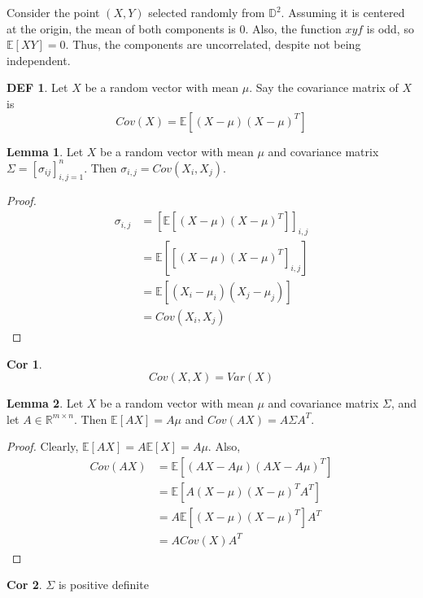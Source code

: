 \documentclass{article}
\theoremstyle{definition}\newtheorem{definition}{DEF}
\theoremstyle{lemma}\newtheorem{lemma}{Lemma}
\theoremstyle{corrolary}\newtheorem{corrolary}{Cor}
\begin{document}
\begin{example}
Consider the point $(X,Y)$ selected randomly from $\mathbb{D}^2$.
Assuming it is centered at the origin, the mean of both components is 0.
Also, the function $xyf$ is odd, so $\mathbb{E}[XY]=0$.
Thus, the components are uncorrelated, despite not being independent.
\end{example}

\begin{definition}
Let $X$ be a random vector with mean $\mu$.
Say the covariance matrix of $X$ is
\begin{equation}
Cov(X)=\mathbb{E}[(X-\mu)(X-\mu)^T]
\end{equation}
\end{definition}

\begin{lemma}
Let $X$ be a random vector with mean $\mu$ and covariance matrix $\Sigma=[\sigma_{ij}]_{i,j=1}^n$.
Then $\sigma_{i,j}=Cov(X_i, X_j)$.
\end{lemma}
\begin{proof}
\begin{align*}
\sigma_{i,j}&=\left[ \mathbb{E}[(X-\mu)(X-\mu)^T]\right]_{i,j}\\
&=\mathbb{E}\left[\left[(X-\mu)(X-\mu)^T\right]_{i,j}\right]\\
&=\mathbb{E}[(X_i -\mu_i)(X_j-\mu_j)]\\
&=Cov(X_i, X_j)
\end{align*}
\end{proof}
\begin{corrolary}
\begin{equation*}
Cov(X,X)=Var(X)
\end{equation*}
\end{corrolary}

\begin{lemma}
Let $X$ be a random vector with mean $\mu$ and covariance matrix $\Sigma$, and let $A\in \mathbb{R}^{m\times n}$.
Then $\mathbb{E}[AX]=A\mu$ and $Cov(AX)=A\Sigma A^T$.
\end{lemma}
\begin{proof}
Clearly, $\mathbb{E}[AX]=A\mathbb{E}[X]=A\mu$.
Also,
\begin{align*}
Cov(AX)&=\mathbb{E}[(AX-A\mu)(AX-A\mu)^T]\\
&=\mathbb{E}[A(X-\mu )(X-\mu)^TA^T]\\
&=A\mathbb{E}[(X-\mu)(X-\mu)^T]A^T\\
&=ACov(X)A^T
\end{align*}
\end{proof}
\begin{corrolary}
$\Sigma$ is positive definite
\end{corrolary}
\end{document}
